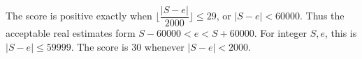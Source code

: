 The score is positive exactly when $\lfloor\dfrac{|S-e|}{2000}\rfloor\le29$, or $|S-e|<60000$. Thus the acceptable real estimates form $\boxed{S-60000<e<S+60000}$. For integer $S,e$, this is $|S-e|\le59999$. The score is 30 whenever $|S-e|<2000$.
